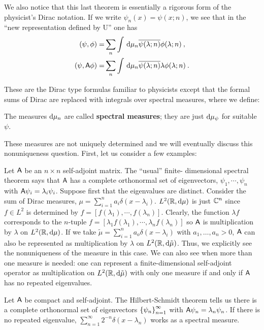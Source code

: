 We also notice that this last theorem is essentially a rigorous form of the physicist's Dirac notation.
If we write $\psi_n(x) = \psi(x;n)$, we see that in the \enquote{new representation defined by U} one has
\begin{align}
    (\psi, \phi) =& \sum_n \int \, \mathrm{d} \mu_n \overline{ \psi(\lambda; n)} \phi(\lambda; n) \:, \\
    (\psi, \mathsf{A} \phi) =& \sum_n \int \, \mathrm{d} \mu_n \overline{ \psi(\lambda; n)} \lambda \phi(\lambda; n) \:.
\end{align}

These are the Dirac type formulas familiar to physicists except that the formal sums of Dirac are replaced with integrals over spectral measures, where we define:

\begin{definition}
    The measures $\mathrm{d} \mu_n$ are called \textbf{spectral measures}; they are just $\mathrm{d} \mu_\psi$ for suitable $\psi$.
\end{definition}

These measures are not uniquely determined and we will eventually discuss this nonuniqueness question. First, let us consider a few examples:

\begin{example}
Let $\mathsf{A}$ be an $n \times n$ self-adjoint matrix. The \enquote{usual} finite- dimensional spectral theorem says that $\mathsf{A}$ has a complete orthonormal set of eigenvectors, $\psi_1, \cdots, \psi_n$ with $\mathsf{A} \psi_i = \lambda_i \psi_i$. Suppose first that the eigenvalues are distinct.
Consider the sum of Dirac measures, $\mu = \sum_{i=1}^n a_i \delta(x-\lambda_i)$. $L^{2}(\mathbb{R}, \mathrm{d} \mu) $ is just $\mathbb{C}^n$ since $f \in L^2$ is determined by $f = [f(\lambda_1), \cdots, f(\lambda_n)]$.
Clearly, the function $\lambda f$ corresponds to the $n$-tuple $f = [\lambda_1 f(\lambda_1), \cdots, \lambda_n f(\lambda_n)]$ so $\mathsf{A}$ is multiplication by $\lambda$ on $L^{2}(\mathbb{R}, \mathrm{d} \mu)$. If we take $\tilde \mu = \sum_{i=1}^n a_o \delta(x-\lambda_i)$ with $a_1, \dots, a_n >0$, $\mathsf{A}$ can also be represented as multiplication by $\lambda$ on $L^{2}(\mathbb{R}, \mathrm{d} \tilde \mu)$. Thus, we explicitly see the nonuniqueness of the measure in this case. We can also see when more than one measure is needed: one can represent a finite-dimensional self-adjoint operator as multiplication on $L^{2}(\mathbb{R}, \mathrm{d} \tilde \mu)$ with only one measure if and only if $\mathsf{A}$ has no repeated eigenvalues.
\end{example}

\begin{example}
Let $\mathsf{A}$ be compact and self-adjoint. The Hilbert-Schmidt theorem tells us there is a complete orthonormal set of eigenvectors $\left \lbrace \psi_n \right \rbrace_{n=1}^\infty$ with $\mathsf{A} \psi_n = \lambda_n \psi_n$. If there is no repeated eigenvalue, $\sum_{n=1}^\infty 2^{-n} \delta(x-\lambda_n)$ works as a spectral measure.
\end{example}

